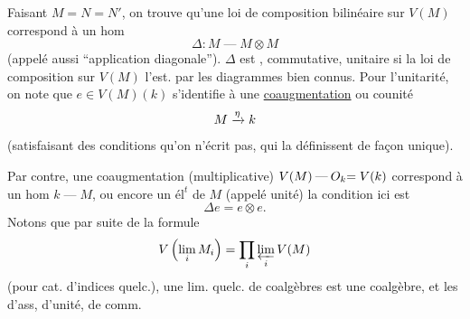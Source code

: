 Faisant $M=N=N'$, on trouve qu'une loi de composition bilinéaire sur $V(M)$ correspond à un hom
\[
\Delta:M\mathbin{\text{---}}M\otimes M
\]
(appelé aussi ``application diagonale''). 
$\Delta$ est ,  commutative,  unitaire si la loi de composition sur $V(M)$ l'est.
  par les diagrammes bien connus. Pour l'unitarité, on note que $e\in V(M)(k)$ s'identifie à une \uline{coaugmentation} ou counité
\[
M\xrightarrow{{\eta}}k
\]
(satisfaisant des conditions qu'on n'écrit pas, qui la définissent de façon unique).

Par contre, une  coaugmentation (multiplicative)
$V(M)\mathbin{\text{---}}O_k{=V(k)}$ correspond à un hom $k\mathbin{\text{---}}M$, ou encore un $\mathrm{él}^t$ de $M$ (appelé unité)
la condition ici est
\[
\Delta e=e\otimes e.
\]
Notons que par suite de la formule
\[
V\left(\lim_i M_i\right)={{\prod_i}}\varprojlim_i V(M)
\]
(pour cat. d'indices quelc.), une lim. quelc. de coalgèbres est une coalgèbre, et les  d'ass, d'unité, de comm.

